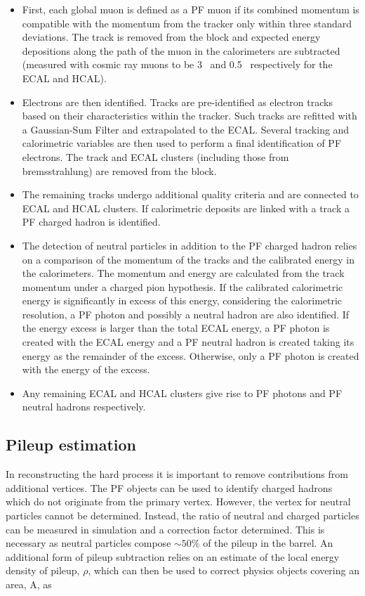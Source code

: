 \begin{itemize}
\item First, each global muon is defined as a PF muon if its combined momentum is compatible with the momentum 
from the tracker only within three standard deviations. The track is removed from the block and expected energy depositions
along the path of the muon in the calorimeters are subtracted (measured with
cosmic ray muons to be 3 \GeV~and 0.5 \GeV~respectively for the ECAL and HCAL).
\item Electrons are then identified. Tracks are pre-identified as electron tracks based on their 
characteristics within the tracker. Such tracks are refitted with a Gaussian-Sum Filter and extrapolated to the ECAL. 
Several tracking and calorimetric variables are then used to perform a final identification of PF electrons. The track
and ECAL clusters (including those from bremsstrahlung) are removed from the block.
\item The remaining tracks undergo additional quality criteria and are connected to ECAL and HCAL clusters. 
If calorimetric deposits are linked with a track a PF charged hadron is identified. 
\item The detection of neutral particles in addition to the PF charged hadron 
relies on a comparison of the momentum of the tracks and the calibrated energy in the calorimeters. 
The momentum and energy are calculated from the track momentum under a charged pion hypothesis. 
If the calibrated calorimetric energy is significantly in excess of this energy, considering
the calorimetric resolution, a PF photon and possibly a neutral hadron are also identified. 
If the energy excess is larger than the total ECAL energy, a PF photon is created with the ECAL energy and a 
PF neutral hadron is created taking its energy as the remainder of the excess. 
Otherwise, only a PF photon is created with the energy of the excess.
\item Any remaining ECAL and HCAL clusters give rise to PF photons and PF neutral hadrons respectively.
\end{itemize}

\subsection{Pileup estimation}

In reconstructing the hard process it is important to remove contributions from additional
vertices. The PF objects can be used to identify 
charged hadrons which do not originate from the primary vertex. However, the vertex 
for neutral particles cannot be determined. Instead, the ratio of neutral and 
charged particles can be measured in simulation and a correction factor determined.
This is necessary as neutral particles compose $\sim 50\%$ of the pileup in the barrel.
An additional form of pileup subtraction relies on an estimate of the local energy density 
of pileup, $\rho$, which can then be used to correct physics objects covering an area,
A, as

